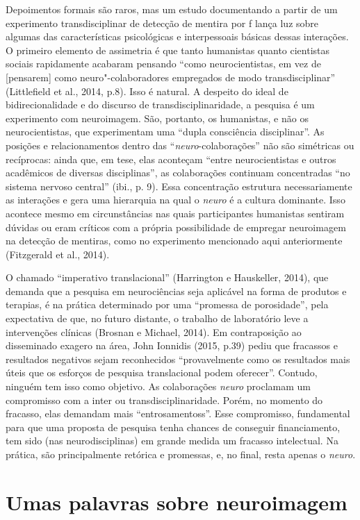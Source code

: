 Depoimentos formais são raros, mas um estudo documentando a partir de um
experimento transdisciplinar de detecção de mentira por f lança luz
sobre algumas das características psicológicas e interpessoais básicas
dessas interações. O primeiro elemento de assimetria é que tanto
humanistas quanto cientistas sociais rapidamente acabaram pensando
``como neurocientistas, em vez de {[}pensarem{]} como
neuro"-colaboradores empregados de modo transdisciplinar'' (Littlefield
et al., 2014, p.8). Isso é natural. A despeito do ideal de
bidirecionalidade e do discurso de transdisciplinaridade, a pesquisa é
um experimento com neuroimagem. São, portanto, os humanistas, e não os
neurocientistas, que experimentam uma ``dupla consciência disciplinar''.
As posições e relacionamentos dentro das ``\emph{neuro}-colaborações''
não são simétricas ou recíprocas: ainda que, em tese, elas aconteçam
``entre neurocientistas e outros acadêmicos de diversas disciplinas'',
as colaborações continuam concentradas ``no sistema nervoso central''
(ibi., p. 9). Essa concentração estrutura necessariamente as interações
e gera uma hierarquia na qual o \emph{neuro} é a cultura dominante. Isso
acontece mesmo em circunstâncias nas quais participantes humanistas
sentiram dúvidas ou eram críticos com a própria possibilidade de
empregar neuroimagem na detecção de mentiras, como no experimento
mencionado aqui anteriormente (Fitzgerald et al., 2014).

O chamado ``imperativo translacional'' (Harrington e Hauskeller, 2014),
que demanda que a pesquisa em neurociências seja aplicável na forma de
produtos e terapias, é na prática determinado por uma ``promessa de
porosidade'', pela expectativa de que, no futuro distante, o trabalho de
laboratório leve a intervenções clínicas (Brosnan e Michael, 2014). Em
contraposição ao disseminado exagero na área, John Ionnidis (2015, p.39)
pediu que fracassos e resultados negativos sejam reconhecidos
``provavelmente como os resultados mais úteis que os esforços de
pesquisa translacional podem oferecer''. Contudo, ninguém tem isso como
objetivo. As colaborações \emph{neuro} proclamam um compromisso com a
inter ou transdisciplinaridade. Porém, no momento do fracasso, elas
demandam mais ``entrosamentoss''. Esse compromisso, fundamental para que
uma proposta de pesquisa tenha chances de conseguir financiamento, tem
sido (nas neurodisciplinas) em grande medida um fracasso intelectual. Na
prática, são principalmente retórica e promessas, e, no final, resta
apenas o \emph{neuro}.

\chapter{Umas palavras sobre neuroimagem}

